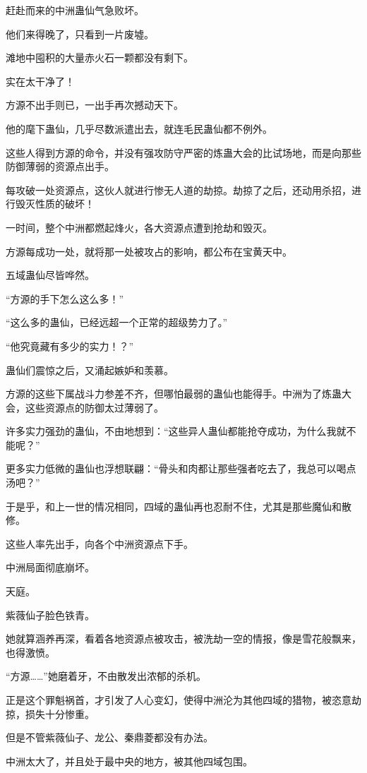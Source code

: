 \begin{this_body}
赶赴而来的中洲蛊仙气急败坏。

他们来得晚了，只看到一片废墟。

滩地中囤积的大量赤火石一颗都没有剩下。

实在太干净了！

方源不出手则已，一出手再次撼动天下。

他的麾下蛊仙，几乎尽数派遣出去，就连毛民蛊仙都不例外。

这些人得到方源的命令，并没有强攻防守严密的炼蛊大会的比试场地，而是向那些防御薄弱的资源点出手。

每攻破一处资源点，这伙人就进行惨无人道的劫掠。劫掠了之后，还动用杀招，进行毁灭性质的破坏！

一时间，整个中洲都燃起烽火，各大资源点遭到抢劫和毁灭。

方源每成功一处，就将那一处被攻占的影响，都公布在宝黄天中。

五域蛊仙尽皆哗然。

“方源的手下怎么这么多！”

“这么多的蛊仙，已经远超一个正常的超级势力了。”

“他究竟藏有多少的实力！？”

蛊仙们震惊之后，又涌起嫉妒和羡慕。

方源的这些下属战斗力参差不齐，但哪怕最弱的蛊仙也能得手。中洲为了炼蛊大会，这些资源点的防御太过薄弱了。

许多实力强劲的蛊仙，不由地想到：“这些异人蛊仙都能抢夺成功，为什么我就不能呢？”

更多实力低微的蛊仙也浮想联翩：“骨头和肉都让那些强者吃去了，我总可以喝点汤吧？”

于是乎，和上一世的情况相同，四域的蛊仙再也忍耐不住，尤其是那些魔仙和散修。

这些人率先出手，向各个中洲资源点下手。

中洲局面彻底崩坏。

天庭。

紫薇仙子脸色铁青。

她就算涵养再深，看着各地资源点被攻击，被洗劫一空的情报，像是雪花般飘来，也得激愤。

“方源……”她磨着牙，不由散发出浓郁的杀机。

正是这个罪魁祸首，才引发了人心变幻，使得中洲沦为其他四域的猎物，被恣意劫掠，损失十分惨重。

但是不管紫薇仙子、龙公、秦鼎菱都没有办法。

中洲太大了，并且处于最中央的地方，被其他四域包围。


\end{this_body}
